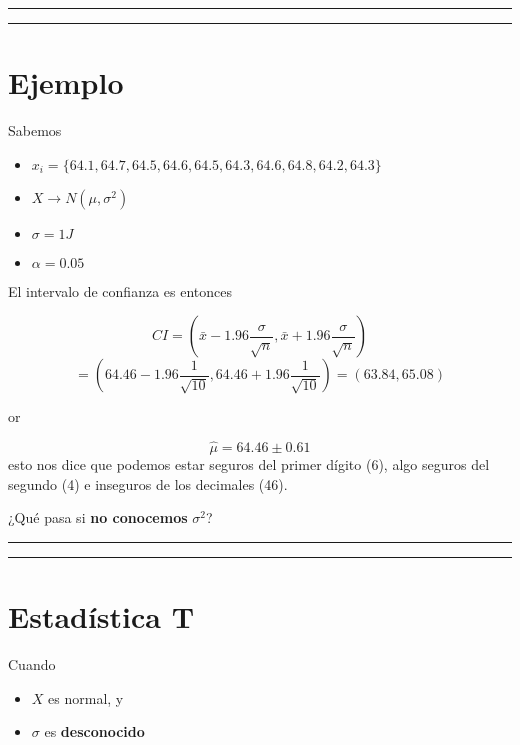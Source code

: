 \documentclass[
]{book}
\providecommand{\tightlist}{%
  \setlength{\itemsep}{0pt}\setlength{\parskip}{0pt}}
\begin{document}
\begin{center}\rule{0.5\linewidth}{0.5pt}\end{center}

\begin{center}\rule{0.5\linewidth}{0.5pt}\end{center}

\hypertarget{ejemplo-15}{%
\section{Ejemplo}\label{ejemplo-15}}

Sabemos

\begin{itemize}
\tightlist
\item
  \(x_i=\{64.1, 64.7, 64.5, 64.6, 64.5, 64.3, 64.6, 64.8, 64.2, 64.3\}\)
\item
  \(X \rightarrow N(\mu, \sigma^2)\)
\item
  \(\sigma=1J\)
\item
  \(\alpha=0.05\)
\end{itemize}

El intervalo de confianza es entonces

\[CI=(\bar{x}-1.96 \frac{\sigma}{\sqrt{n}}, \bar{x}+1.96  \frac{\sigma}{\sqrt{n}})\]
\[=(64.46-1.96 \frac{1}{\sqrt{10}}, 64.46+1.96  \frac{1}{\sqrt{10}})=(63.84,65.08)\]

or

\[\hat{\mu}=64.46 \pm 0.61\]
esto nos dice que podemos estar seguros del primer dígito (6), algo seguros del segundo (4) e inseguros de los decimales (46).

¿Qué pasa si \textbf{no conocemos} \(\sigma^2\)?

\begin{center}\rule{0.5\linewidth}{0.5pt}\end{center}

\begin{center}\rule{0.5\linewidth}{0.5pt}\end{center}

\hypertarget{estaduxedstica-t-3}{%
\section{Estadística T}\label{estaduxedstica-t-3}}

Cuando

\begin{itemize}
\tightlist
\item
  \(X\) es normal, y
\item
  \(\sigma\) es \textbf{desconocido}
\end{itemize}
\end{document}
